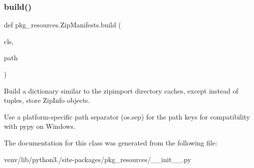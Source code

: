 \subsubsection{\texorpdfstring{build()}{build()}}
{\footnotesize\ttfamily def pkg\+\_\+resources.\+Zip\+Manifests.\+build (\begin{DoxyParamCaption}\item[{}]{cls,  }\item[{}]{path }\end{DoxyParamCaption})}

\begin{DoxyVerb}Build a dictionary similar to the zipimport directory
caches, except instead of tuples, store ZipInfo objects.

Use a platform-specific path separator (os.sep) for the path keys
for compatibility with pypy on Windows.
\end{DoxyVerb}
 

The documentation for this class was generated from the following file\+:\begin{DoxyCompactItemize}
\item 
venv/lib/python3./site-\/packages/pkg\+\_\+resources/\+\_\+\+\_\+init\+\_\+\+\_\+.\+py\end{DoxyCompactItemize}
